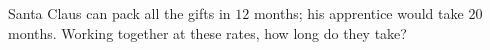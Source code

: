 Santa Claus can pack all the gifts in $12$ months; his apprentice would take $20$ months. Working together at these rates, how long do they take?
